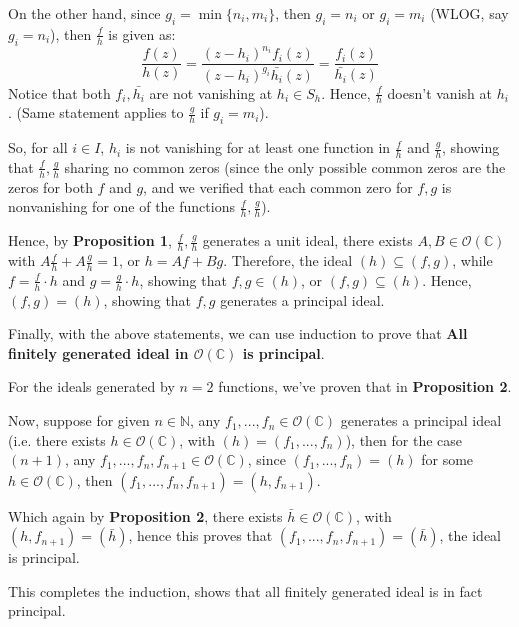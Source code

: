 \documentclass{article}
\begin{document}
\begin{itemize}
    On the other hand, since $g_i=\min\{n_i,m_i\}$, then $g_i=n_i$ or $g_i=m_i$ (WLOG, say $g_i=n_i$), then $\frac{f}{h}$ is given as:
    $$\frac{f(z)}{h(z)}=\frac{(z-h_i)^{n_i}f_i(z)}{(z-h_i)^{g_i}\bar{h_i}(z)} = \frac{f_i(z)}{\bar{h_i}(z)}$$
    Notice that both $f_i,\bar{h_i}$ are not vanishing at $h_i\in S_h$. Hence, $\frac{f}{h}$ doesn't vanish at $h_i$. (Same statement applies to $\frac{g}{h}$ if $g_i=m_i$).

    So, for all $i\in I$, $h_i$ is not vanishing for at least one function in $\frac{f}{h}$ and $\frac{g}{h}$, showing that $\frac{f}{h},\frac{g}{h}$ sharing no common zeros (since the only possible common zeros are the zeros for both $f$ and $g$, and we verified that each common zero for $f,g$ is nonvanishing for one of the functions $\frac{f}{h},\frac{g}{h}$).
    
    Hence, by \textbf{Proposition 1}, $\frac{f}{h},\frac{g}{h}$ generates a unit ideal, there exists $A,B\in\mathcal{O}(\mathbb{C})$ with $A\frac{f}{h}+A\frac{g}{h}=1$, or $h=Af+Bg$.
    Therefore, the ideal $(h)\subseteq(f,g)$, while $f=\frac{f}{h}\cdot h$ and $g=\frac{g}{h}\cdot h$, showing that $f,g\in (h)$, or $(f,g)\subseteq (h)$.
    Hence, $(f,g)=(h)$, showing that $f,g$ generates a principal ideal.

    \hfil

    Finally, with the above statements, we can use induction to prove that \textbf{All finitely generated ideal in $\mathcal{O}(\mathbb{C})$ is principal}.

    For the ideals generated by $n=2$ functions, we've proven that in \textbf{Proposition 2}.

    Now, suppose for given $n\in\mathbb{N}$, any $f_1,...,f_n\in\mathcal{O}(\mathbb{C})$ generates a principal ideal (i.e. there exists $h\in\mathcal{O}(\mathbb{C})$, with $(h)=(f_1,...,f_n)$),
    then for the case $(n+1)$, any $f_1,...,f_n,f_{n+1}\in\mathcal{O}(\mathbb{C})$, since $(f_1,...,f_n)=(h)$ for some $h\in\mathcal{O}(\mathbb{C})$, then $(f_1,...,f_n,f_{n+1})=(h,f_{n+1})$.
    
    Which again by \textbf{Proposition 2}, there exists $\bar{h}\in\mathcal{O}(\mathbb{C})$, with $(h,f_{n+1})=(\bar{h})$, hence this proves that $(f_1,...,f_n,f_{n+1})=(\bar{h})$, the ideal is principal.
    
    This completes the induction, shows that all finitely generated ideal is in fact principal.
\end{itemize}
\end{document}
